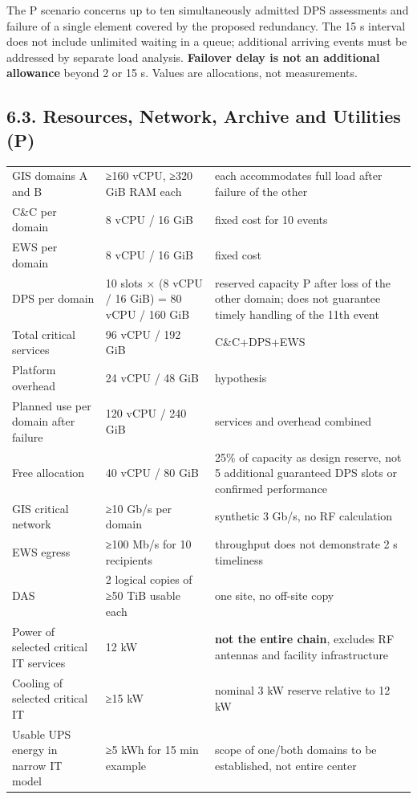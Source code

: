 The P scenario concerns up to ten simultaneously admitted DPS assessments and failure of a single element covered by the proposed redundancy. The 15 s interval does not include unlimited waiting in a queue; additional arriving events must be addressed by separate load analysis. \textbf{Failover delay is not an additional allowance} beyond 2 or 15 s. Values are allocations, not measurements.

\subsection{6.3. Resources, Network, Archive and Utilities (P)}\label{technical-resource-allocations-corrected-version}

\begingroup{}
\begin{longtable}{|P{0.27}|P{0.31}|P{0.42}|}
\hline{}
 &  & \\ \hline
\endhead
\hline\endlastfoot
GIS domains A and B & ≥160 vCPU, ≥320 GiB RAM each & each accommodates full load after failure of the other\\ \hline
C\&C per domain & 8 vCPU /\allowbreak{} 16 GiB & fixed cost for 10 events\\ \hline
EWS per domain & 8 vCPU /\allowbreak{} 16 GiB & fixed cost\\ \hline
DPS per domain & 10 slots × (8 vCPU /\allowbreak{} 16 GiB) = 80 vCPU /\allowbreak{} 160 GiB & reserved capacity P after loss of the other domain; does not guarantee timely handling of the 11th event\\ \hline
Total critical services & 96 vCPU /\allowbreak{} 192 GiB & C\&C+DPS+EWS\\ \hline
Platform overhead & 24 vCPU /\allowbreak{} 48 GiB & hypothesis\\ \hline
Planned use per domain after failure & 120 vCPU /\allowbreak{} 240 GiB & services and overhead combined\\ \hline
Free allocation & 40 vCPU /\allowbreak{} 80 GiB & 25\% of capacity as design reserve, not 5 additional guaranteed DPS slots or confirmed performance\\ \hline
GIS critical network & ≥10 Gb/\allowbreak{}s per domain & synthetic 3 Gb/\allowbreak{}s, no RF calculation\\ \hline
EWS egress & ≥100 Mb/\allowbreak{}s for 10 recipients & throughput does not demonstrate 2 s timeliness\\ \hline
DAS & 2 logical copies of ≥50 TiB usable each & one site, no off-site copy\\ \hline
Power of selected critical IT services & 12 kW & \textbf{not the entire chain}, excludes RF antennas and facility infrastructure\\ \hline
Cooling of selected critical IT & ≥15 kW & nominal 3 kW reserve relative to 12 kW\\ \hline
Usable UPS energy in narrow IT model & ≥5 kWh for 15 min example & scope of one/\allowbreak{}both domains to be established, not entire center\\*
\end{longtable}
\endgroup

